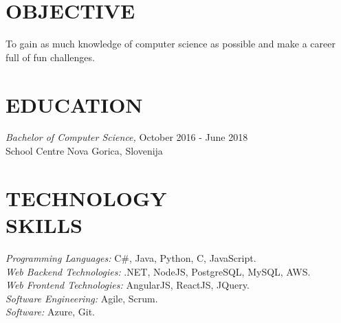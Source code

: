 \documentclass[margin, 10pt]{res} %
\begin{document}
\begin{resume}

 
\section{OBJECTIVE}  

To gain as much knowledge of computer science as possible and make a career full of fun challenges. 


\section{EDUCATION}

{\sl Bachelor of Computer Science,}  \hfill October 2016 - June 2018 \\
School Centre Nova Gorica, Slovenija\\
 

\section{TECHNOLOGY \\ SKILLS} 

{\sl Programming Languages:} C\#, Java, Python, C, JavaScript. \\
{\sl Web Backend Technologies:} .NET, NodeJS, PostgreSQL, MySQL, AWS. \\
{\sl Web Frontend Technologies:} AngularJS, ReactJS, JQuery. \\
{\sl Software Engineering:} Agile, Scrum. \\
{\sl Software:} Azure, Git. \\
 
 

\end{resume}
\end{document}
